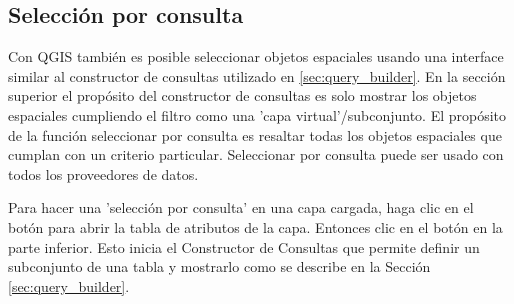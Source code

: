 \subsection{Selecci\'on por consulta}\label{sec:select_by_query}

Con QGIS también es posible seleccionar objetos espaciales usando una interface similar al constructor de consultas utilizado en \ref{sec:query_builder}. En la secci\'on superior el prop\'osito del constructor de consultas es solo mostrar los objetos espaciales cumpliendo el filtro como una 'capa virtual'/subconjunto. El prop\'osito de la funci\'on seleccionar por consulta es resaltar todas los objetos espaciales que cumplan con un criterio particular. Seleccionar por consulta puede ser usado con todos los proveedores de datos.

Para hacer una 'selecci\'on por consulta' en una capa cargada, haga clic en el bot\'on  para abrir la tabla de atributos de la capa. Entonces clic en el bot\'on  en la parte inferior. Esto inicia el Constructor de Consultas que permite definir un subconjunto de una tabla y mostrarlo como se describe en la Secci\'on \ref{sec:query_builder}.


